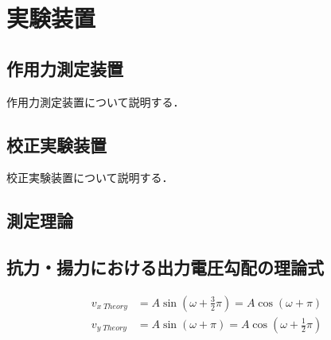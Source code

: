 \section{実験装置}

\subsection{作用力測定装置}
作用力測定装置について説明する．

\subsection{校正実験装置}
校正実験装置について説明する．

\subsection{測定理論}

\subsection{抗力・揚力における出力電圧勾配の理論式}

\begin{align}
    v_{x\; Theory} &= A \sin \left(\omega + \frac{3}{2} \pi\right) = A \cos \left(\omega + \pi\right) \\ 
    v_{y\; Theory} &= A \sin \left(\omega + \pi\right) = A \cos \left(\omega + \frac{1}{2} \pi\right) 
\end{align}
